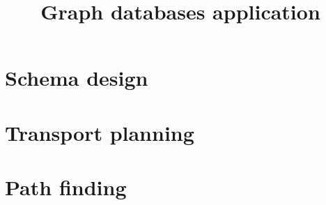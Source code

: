 \documentclass{pgnotes}
\title{Graph databases application}
\begin{document}
\maketitle

\section{Schema design}

\section{Transport planning}

\section{Path finding}
\end{document}
